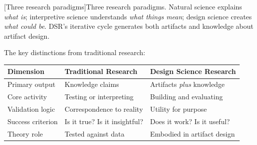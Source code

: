 \documentclass[../main.tex]{subfiles}
\begin{document}
\begin{center}
[Three research paradigms]{Three research paradigms. Natural science explains \emph{what is}; interpretive science understands \emph{what things mean}; design science creates \emph{what could be}. DSR's iterative cycle generates both artifacts and knowledge about artifact design.}
\label{fig:three-paradigms}
\end{center}

The key distinctions from traditional research:

\tableminimal
\small
\begin{center}
\begin{tabular}{@{}p{3.5cm}p{3.5cm}p{3.5cm}@{}}
\toprule
\textbf{Dimension} & \textbf{Traditional Research} & \textbf{Design Science Research} \\
\midrule
Primary output & Knowledge claims & Artifacts \emph{plus} knowledge \\
Core activity & Testing or interpreting & Building and evaluating \\
Validation logic & Correspondence to reality & Utility for purpose \\
Success criterion & Is it true? Is it insightful? & Does it work? Is it useful? \\
Theory role & Tested against data & Embodied in artifact design \\
\bottomrule
\end{tabular}
\end{center}
\normalsize
\end{document}
